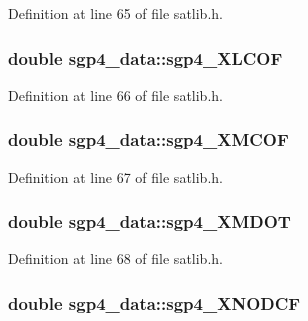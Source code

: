 Definition at line 65 of file satlib.\-h.

\hypertarget{structsgp4__data_aab16f57889d7d7cd0c1eb3a9edb6972b}{
\subsubsection[{sgp4\-\_\-\-X\-L\-C\-O\-F}]{\setlength{\rightskip}{0pt plus 5cm}double sgp4\-\_\-data\-::sgp4\-\_\-\-X\-L\-C\-O\-F}}\label{structsgp4__data_aab16f57889d7d7cd0c1eb3a9edb6972b}


Definition at line 66 of file satlib.\-h.

\hypertarget{structsgp4__data_acd188cc36233d0d726b79ee167d17742}{
\subsubsection[{sgp4\-\_\-\-X\-M\-C\-O\-F}]{\setlength{\rightskip}{0pt plus 5cm}double sgp4\-\_\-data\-::sgp4\-\_\-\-X\-M\-C\-O\-F}}\label{structsgp4__data_acd188cc36233d0d726b79ee167d17742}


Definition at line 67 of file satlib.\-h.

\hypertarget{structsgp4__data_a229f05e18a9bda018ea8572a2d52eef9}{
\subsubsection[{sgp4\-\_\-\-X\-M\-D\-O\-T}]{\setlength{\rightskip}{0pt plus 5cm}double sgp4\-\_\-data\-::sgp4\-\_\-\-X\-M\-D\-O\-T}}\label{structsgp4__data_a229f05e18a9bda018ea8572a2d52eef9}


Definition at line 68 of file satlib.\-h.

\hypertarget{structsgp4__data_a24e3ca073a4b8974e2b460793e7355df}{
\subsubsection[{sgp4\-\_\-\-X\-N\-O\-D\-C\-F}]{\setlength{\rightskip}{0pt plus 5cm}double sgp4\-\_\-data\-::sgp4\-\_\-\-X\-N\-O\-D\-C\-F}}\label{structsgp4__data_a24e3ca073a4b8974e2b460793e7355df}



